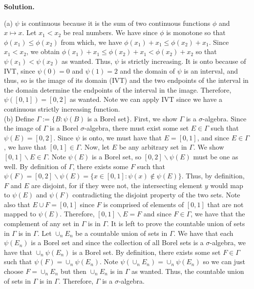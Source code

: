 \documentclass{article}
\begin{document}
    \textbf{Solution.}

    (a) $\psi$ is continuous because it is the sum of two continuous functions $\phi$ and $x\mapsto x$. Let $x_1 < x_2$ be real numbers.
    We have since $\phi$ is monotone so that $\phi(x_1)\leq \phi(x_2)$ from which, we have $\phi(x_1) + x_1\leq \phi(x_2) + x_1$.
    Since $x_1<x_2$, we obtain $\phi(x_1) + x_1\leq \phi(x_2)+x_1 < \phi(x_2) + x_2$ so that $\psi(x_1)<\psi(x_2)$ as wanted. Thus,
    $\psi$ is strictly increasing. It is onto because of IVT, since $\psi(0) = 0$ and $\psi(1) = 2$ and the domain of $\psi$
    is an interval, and thus, 
    so is the image of its domain (IVT) and the two endpoints of the interval in the domain determine the endpoints
    of the interval in the image. Therefore, $\psi([0,1]) = [0,2]$ as wanted. Note we can apply IVT since we have a continuous
    strictly increasing function.\\

    (b) Define $\Gamma := \{B: \psi(B)$ is a Borel set$\}$. First, we show $\Gamma$ is a $\sigma$-algebra. Since the image of $\Gamma$
    is a Borel $\sigma$-algebra, there must exist some set $E\in\Gamma$ such that $\psi(E) = [0,2]$. Since $\psi$ is onto, we must
    have that $E = [0,1]$, and since $E\in\Gamma$, we have that $[0,1]\in\Gamma$. Now, let $E$ be any arbitrary set in $\Gamma$. We
    show $[0,1]\backslash E\in\Gamma$. Note $\psi(E)$ is a Borel set, so $[0,2]\backslash\psi(E)$ must be one as well. By definition
    of $\Gamma$, there exists some $F$ such that $\psi(F) = [0,2]\backslash\psi(E) = \{x\in[0,1]: \psi(x)\not\in\psi(E)\}$. Thus,
    by definition, $F$ and $E$ are disjoint, for if they were not, the intersecting element $y$ would map to $\psi(E)$ and $\psi(F)$
    contradicting the disjoint property of the two sets. Note also that $E\cup F = [0,1]$ since $F$ is comprised of elements of
    $[0,1]$ that are not mapped to $\psi(E)$. Therefore, $[0,1]\backslash E = F$ and since $F\in\Gamma$, we have that the complement
    of any set in $\Gamma$ is in $\Gamma$. It is left to prove the countable union of sets in $\Gamma$ is in $\Gamma$. Let
    $\cup_n E_n$ be a countable union of sets in $\Gamma$. We have that each $\psi(E_n)$ is a Borel set and since the collection
    of all Borel sets is a $\sigma$-algebra, we have that $\cup_n \psi(E_n)$ is a Borel set. By definition, there exists some
    set $F\in\Gamma$ such that $\psi(F) = \cup_n \psi(E_n)$. Note $\psi(\cup_n E_n) = \cup_n \psi(E_n)$ so we can just choose
    $F = \cup_n E_n$ but then $\cup_n E_n$ is in $\Gamma$ as wanted. Thus, the countable union of sets in $\Gamma$ is in $\Gamma$.
    Therefore, $\Gamma$ is a $\sigma$-algebra.\\
\end{document}
